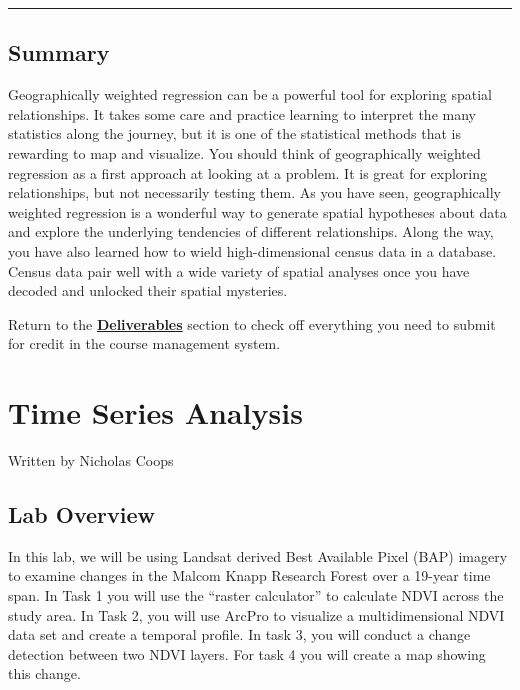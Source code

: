 \documentclass[
]{book}
\begin{document}
\begin{center}\rule{0.5\linewidth}{0.5pt}\end{center}

\hypertarget{summary-4}{%
\section*{Summary}\label{summary-4}}

Geographically weighted regression can be a powerful tool for exploring spatial relationships. It takes some care and practice learning to interpret the many statistics along the journey, but it is one of the statistical methods that is rewarding to map and visualize. You should think of geographically weighted regression as a first approach at looking at a problem. It is great for exploring relationships, but not necessarily testing them. As you have seen, geographically weighted regression is a wonderful way to generate spatial hypotheses about data and explore the underlying tendencies of different relationships. Along the way, you have also learned how to wield high-dimensional census data in a database. Census data pair well with a wide variety of spatial analyses once you have decoded and unlocked their spatial mysteries.

Return to the \protect\hyperlink{lab6-deliverables}{\textbf{Deliverables}} section to check off everything you need to submit for credit in the course management system.

\hypertarget{time-series-image-analysis}{%
\chapter{Time Series Analysis}\label{time-series-image-analysis}}

Written by
Nicholas Coops

\hypertarget{lab-overview-5}{%
\section*{Lab Overview}\label{lab-overview-5}}

In this lab, we will be using Landsat derived Best Available Pixel (BAP) imagery to examine changes in the Malcom Knapp Research Forest over a 19-year time span. In Task 1 you will use the ``raster calculator'' to calculate NDVI across the study area. In Task 2, you will use ArcPro to visualize a multidimensional NDVI data set and create a temporal profile. In task 3, you will conduct a change detection between two NDVI layers. For task 4 you will create a map showing this change.
\end{document}
